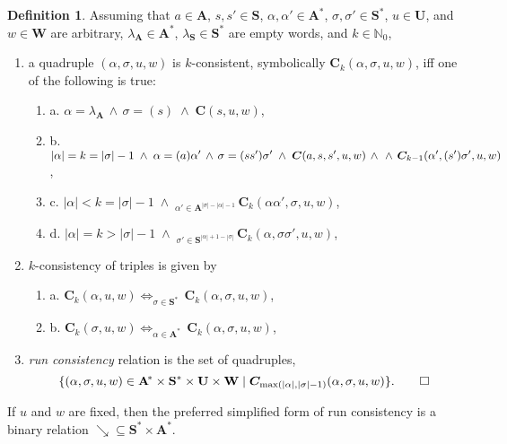 \documentclass [a4paper,12pt] {article}
\theoremstyle{definition}
\newtheorem{definition}{Definition}[section]
\newcommand{\Exists}{}
\DeclareRobustCommand{\Exists}{\mathop{\mathlarger{\exists}}}
\begin{document}
\begin {definition}\label{def:k-consistency}
  Assuming that $a \in \mathbf {A}$, $s, s' \in \mathbf {S}$, $\alpha,
  \alpha' \in \mathbf {A}^{\!\ast}$, $\sigma, \sigma' \in \mathbf
          {S}^\ast$, $u \in \mathbf {U}$, and $w \in \mathbf {W}$ are
          arbitrary, $\lambda_{\mathbf {A}} \in \mathbf {A}^{\!\ast}$,
          $\lambda_{\mathbf {S}} \in \mathbf {S}^{\ast}$ are empty
          words, and $k \in \mathbb {N}_0$,

\begin {enumerate}[leftmargin=16pt]
  \item a quadruple $(\alpha, \sigma, u, w)$ is $k$-consistent,
    symbolically $\bm {C}_k(\alpha, \sigma, u, w)$, iff one of the
    following is true:
%
\begin {enumerate}[leftmargin=16pt]
\item[a.] $\displaystyle\alpha = \lambda_{\mathbf {A}} \,\land\, \sigma = (s) \;\land\; \bm {C}(s, u, w)$,
\item[b.] $\displaystyle|\alpha| = k = |\sigma| - 1 \;\land\;
  \alpha = (a)\alpha' \,\land\, \sigma = (ss')\sigma' \;\land\; \bm {C}(a, s, s', u, w) \,\land\,\\
  \,\land\, \bm {C}_{k-1}(\alpha', (s')\sigma', u, w)$,
\item[c.] $\displaystyle|\alpha| < k = |\sigma| - 1 \;\land\;
  \Exists_{\alpha' \in \mathbf {A}^{\!|\sigma| - |\alpha| - 1}}\,\bm {C}_k(\alpha\alpha', \sigma, u, w)$,
\item[d.] $\displaystyle|\alpha| = k > |\sigma| - 1 \;\land\;
    \Exists_{\sigma' \in \mathbf {S}^{|\alpha| + 1 - |\sigma|}}\,\bm {C}_k(\alpha, \sigma\sigma', u, w)$,
\end {enumerate}

\item $k$-consistency of triples is given by
%
\begin {enumerate}[leftmargin=16pt]
\item[a.] $\displaystyle\bm {C}_k(\alpha, u, w) \iff \Exists_{\sigma \in \mathbf {S}^\ast}\,\bm {C}_k(\alpha, \sigma, u, w)$,
\item[b.] $\displaystyle\bm {C}_k(\sigma, u, w) \iff \Exists_{\alpha \in \mathbf {A}^{\!\ast}}\,\bm {C}_k(\alpha, \sigma, u, w)$,
\end {enumerate}

\item {\em run consistency}\/ relation is the set of quadruples,
%
\begin {equation*}
  \{ (\alpha, \sigma, u, w) \in \mathbf {A}^{\!\ast} \times \mathbf {S}^{\ast} \times \mathbf {U} \times \mathbf {W}
  \;|\; \bm {C}_{\max (|\alpha|, |\sigma| - 1)}(\alpha, \sigma, u, w) \}.\qed
\end {equation*}
\end {enumerate}
\end {definition}

\noindent
If $u$ and $w$ are fixed, then the preferred simplified form of run
consistency is a binary relation $\searrow \subseteq \mathbf
{S}^{\ast} \times \mathbf {A}^{\!\ast}$.
\end{document}
